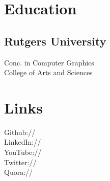 \documentclass[]{deedy-resume-openfont}
\begin{document}
%
%


%
%

\begin{minipage}[t]{0.33\textwidth} 


\section{Education} 

\subsection{Rutgers University}
\sectionsep

Conc. in Computer Graphics \\
College of Arts and Sciences \\
\sectionsep


\section{Links} 
Github:// \href{https://github.com/11}
{} \\
LinkedIn://  \href{https://www.linkedin.com/in/DougRudolphJr}{} \\
YouTube://  \href{https://www.youtube.com/user/DeedyDash007}{} \\
Twitter://  \href{https://twitter.com/debarghya_das}{} \\
Quora://  \href{https://www.quora.com/Debarghya-Das}{}
\sectionsep


\end{minipage}
\end{document}
